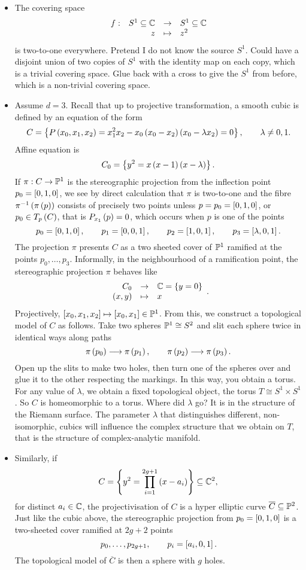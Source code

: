 \begin{example*}
\hfill
\begin{itemize}
\item The covering space
$$ \function[f]{S^1 \subseteq \C}{S^1 \subseteq \C}{z}{z^2} $$
is two-to-one everywhere. Pretend I do not know the source $ S^1 $. Could have a disjoint union of two copies of $ S^1 $ with the identity map on each copy, which is a trivial covering space. Glue back with a cross to give the $ S^1 $ from before, which is a non-trivial covering space.
\item Assume $ d = 3 $. Recall that up to projective transformation, a smooth cubic is defined by an equation of the form
$$ C = \cb{P\rb{x_0, x_1, x_2} = x_1^2x_2 - x_0\rb{x_0 - x_2}\rb{x_0 - \lambda x_2} = 0}, \qquad \lambda \ne 0, 1. $$
Affine equation is
$$ C_0 = \cb{y^2 = x\rb{x - 1}\rb{x - \lambda}}. $$
If $ \pi : C \to \P^1 $ is the stereographic projection from the inflection point $ p_0 = \sb{0, 1, 0} $, we see by direct calculation that $ \pi $ is two-to-one and the fibre $ \pi^{-1}\rb{\pi\rb{p}} $ consists of precisely two points unless $ p = p_0 = \sb{0, 1, 0} $, or $ p_0 \in T_p\rb{C} $, that is $ P_{x_1}\rb{p} = 0 $, which occurs when $ p $ is one of the points
$$ p_0 = \sb{0, 1, 0}, \qquad p_1 = \sb{0, 0, 1}, \qquad p_2 = \sb{1, 0, 1}, \qquad p_3 = \sb{\lambda, 0, 1}. $$
The projection $ \pi $ presents $ C $ as a two sheeted cover of $ \P^1 $ ramified at the points $ p_0, \dots, p_3 $. Informally, in the neighbourhood of a ramification point, the stereographic projection $ \pi $ behaves like
$$ \function{C_0}{\C = \cb{y = 0}}{\rb{x, y}}{x}. $$
Projectively, $ \sb{x_0, x_1, x_2} \mapsto \sb{x_0, x_1} \in \P^1 $. From this, we construct a topological model of $ C $ as follows. Take two spheres $ \P^1 \cong S^2 $ and slit each sphere twice in identical ways along paths
$$ \pi\rb{p_0} \longrightarrow \pi\rb{p_1}, \qquad \pi\rb{p_2} \longrightarrow \pi\rb{p_3}. $$
Open up the slits to make two holes, then turn one of the spheres over and glue it to the other respecting the markings. In this way, you obtain a torus. For any value of $ \lambda $, we obtain a fixed topological object, the torus $ T \cong S^1 \times S^1 $. So $ C $ is homeomorphic to a torus. Where did $ \lambda $ go? It is in the structure of the Riemann surface. The parameter $ \lambda $ that distinguishes different, non-isomorphic, cubics will influence the complex structure that we obtain on $ T $, that is the structure of complex-analytic manifold.
\item Similarly, if
$$ C = \cb{y^2 = \prod_{i = 1}^{2g + 1} \rb{x - a_i}} \subseteq \C^2, $$
for distinct $ a_i \in \C $, the projectivisation of $ C $ is a hyper elliptic curve $ \overline{C} \subseteq \P^2 $. Just like the cubic above, the stereographic projection from $ p_0 = \sb{0, 1, 0} $ is a two-sheeted cover ramified at $ 2g + 2 $ points
$$ p_0, \dots, p_{2g + 1}, \qquad p_i = \sb{a_i, 0, 1}. $$
The topological model of $ \overline{C} $ is then a sphere with $ g $ holes.
\end{itemize}
\end{example*}

